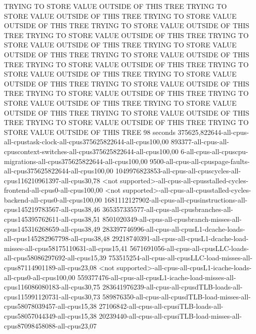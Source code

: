 TRYING TO STORE VALUE OUTSIDE OF THIS TREE
TRYING TO STORE VALUE OUTSIDE OF THIS TREE
TRYING TO STORE VALUE OUTSIDE OF THIS TREE
TRYING TO STORE VALUE OUTSIDE OF THIS TREE
TRYING TO STORE VALUE OUTSIDE OF THIS TREE
TRYING TO STORE VALUE OUTSIDE OF THIS TREE
TRYING TO STORE VALUE OUTSIDE OF THIS TREE
TRYING TO STORE VALUE OUTSIDE OF THIS TREE
TRYING TO STORE VALUE OUTSIDE OF THIS TREE
TRYING TO STORE VALUE OUTSIDE OF THIS TREE
TRYING TO STORE VALUE OUTSIDE OF THIS TREE
TRYING TO STORE VALUE OUTSIDE OF THIS TREE
TRYING TO STORE VALUE OUTSIDE OF THIS TREE
TRYING TO STORE VALUE OUTSIDE OF THIS TREE
TRYING TO STORE VALUE OUTSIDE OF THIS TREE
TRYING TO STORE VALUE OUTSIDE OF THIS TREE
TRYING TO STORE VALUE OUTSIDE OF THIS TREE
TRYING TO STORE VALUE OUTSIDE OF THIS TREE
98 seconds
375625,822644-all-cpus-all-cpustask-clock-all-cpus375625822644-all-cpus100,00
893377-all-cpus-all-cpuscontext-switches-all-cpus375625822644-all-cpus100,00
6-all-cpus-all-cpuscpu-migrations-all-cpus375625822644-all-cpus100,00
9500-all-cpus-all-cpuspage-faults-all-cpus375625822644-all-cpus100,00
1049976823853-all-cpus-all-cpuscycles-all-cpus116210961397-all-cpus30,78
<not supported>-all-cpus-all-cpusstalled-cycles-frontend-all-cpus0-all-cpus100,00
<not supported>-all-cpus-all-cpusstalled-cycles-backend-all-cpus0-all-cpus100,00
1681112127902-all-cpus-all-cpusinstructions-all-cpus145219783567-all-cpus38,46
365357335577-all-cpus-all-cpusbranches-all-cpus145395762611-all-cpus38,51
8501020349-all-cpus-all-cpusbranch-misses-all-cpus145316268659-all-cpus38,49
283397746996-all-cpus-all-cpusL1-dcache-loads-all-cpus145282967798-all-cpus38,48
29218740391-all-cpus-all-cpusL1-dcache-load-misses-all-cpus58175110631-all-cpus15,41
5671691056-all-cpus-all-cpusLLC-loads-all-cpus58086297692-all-cpus15,39
753515254-all-cpus-all-cpusLLC-load-misses-all-cpus87114901189-all-cpus23,08
<not supported>-all-cpus-all-cpusL1-icache-loads-all-cpus0-all-cpus100,00
559377476-all-cpus-all-cpusL1-icache-load-misses-all-cpus116086080183-all-cpus30,75
283641976239-all-cpus-all-cpusdTLB-loads-all-cpus115991120731-all-cpus30,73
589876350-all-cpus-all-cpusdTLB-load-misses-all-cpus58078039457-all-cpus15,38
27106842-all-cpus-all-cpusiTLB-loads-all-cpus58057044349-all-cpus15,38
20239440-all-cpus-all-cpusiTLB-load-misses-all-cpus87098458088-all-cpus23,07
